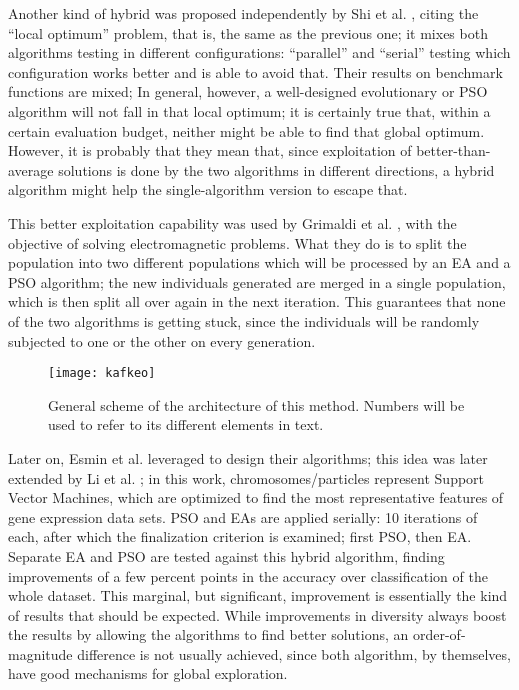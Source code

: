 Another kind of hybrid was proposed independently by 
Shi et al. \cite{shi2003hybrid}, citing the ``local optimum'' problem,
that is, the same as the previous one; it mixes both algorithms
testing in different configurations: ``parallel'' and ``serial''
testing which configuration works better and is able to avoid
that. Their results on benchmark functions are mixed;
In general, however, a well-designed evolutionary or PSO
algorithm will not fall in that local optimum; it is certainly true
that, within a certain evaluation budget, neither might be able to
find that global optimum. However, it is probably that they mean that,
since exploitation of better-than-average solutions is done by the two
algorithms in different directions, a hybrid algorithm might help the
single-algorithm version to escape that.

This better exploitation capability was used by Grimaldi et al.
\cite{grimaldi2005genetical}, with the objective of solving electromagnetic problems. What they do is
to split the population into two different populations which will be
processed by an EA and a PSO algorithm; the new individuals generated
are merged in a single population, which is then split all over again
in the next iteration. This guarantees that none of the two algorithms
is getting stuck, since the individuals will be randomly subjected to
one or the other on every generation.


\begin{figure*}
\texttt{[image: kafkeo]}
\caption{General scheme of the architecture of this method. Numbers will be used to refer to its different elements in text.}
\label{fig:kafkeo}
\end{figure*}
%
Later on, Esmin et al. \cite{esmin2006hybrid} leveraged to design their
algorithms; this idea was
later extended by Li et al. \cite{li2008gene}; in this work,
chromosomes/particles represent Support Vector Machines, which are
optimized to find the most representative features of gene expression
data sets. PSO and EAs are applied serially: 10 iterations of each,
after which the finalization criterion is examined; first PSO, then
EA. Separate EA and PSO are tested against this hybrid algorithm,
finding improvements of a few percent points in the accuracy over
classification of the whole dataset. This marginal, but significant,
improvement is essentially the kind of results that should be
expected. While improvements in diversity always boost the results by
allowing the algorithms to find better solutions, an
order-of-magnitude difference is not usually  achieved, since both
algorithm, by themselves, have good mechanisms for global
exploration.

